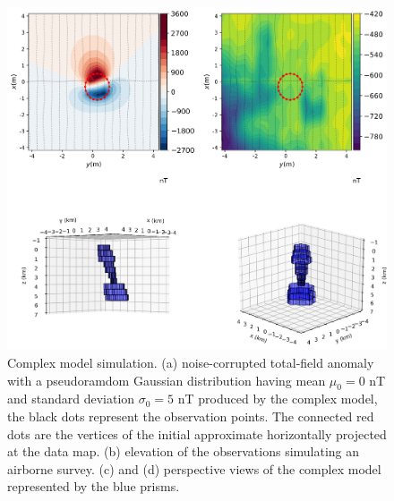 \begin{figure}
    \centering
    \includegraphics[scale=.5]{figures/complex_model_data.png}
    \caption{Complex model simulation. (a) noise-corrupted total-field anomaly with a pseudoramdom Gaussian distribution having mean $\mu_0 = 0$ nT and standard deviation $\sigma_0 = 5$ nT produced by the complex model, the black dots represent the observation points. The connected red dots are the vertices of the initial approximate horizontally projected at the data map. (b) elevation of the observations simulating an airborne survey. (c) and (d) perspective views of the complex model represented by the blue prisms.
}
    \label{fig:complex_model}
\end{figure}

